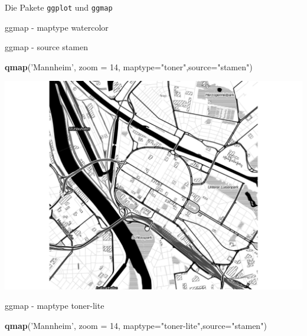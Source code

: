 \documentclass[ignorenonframetext,]{beamer}
\newenvironment{Shaded}{}{}
\newcommand{\KeywordTok}[1]{\textcolor[rgb]{0.00,0.44,0.13}{\textbf{{#1}}}}
\newcommand{\DataTypeTok}[1]{\textcolor[rgb]{0.56,0.13,0.00}{{#1}}}
\newcommand{\DecValTok}[1]{\textcolor[rgb]{0.25,0.63,0.44}{{#1}}}
\newcommand{\StringTok}[1]{\textcolor[rgb]{0.25,0.44,0.63}{{#1}}}
\newcommand{\NormalTok}[1]{{#1}}
\begin{document}
\begin{frame}[fragile]{Die Pakete \texttt{ggplot} und \texttt{ggmap}}
\begin{block}{ggmap - maptype watercolor}
\end{block}

\begin{block}{ggmap - source stamen}

\begin{Shaded}
\begin{Highlighting}[]
\KeywordTok{qmap}\NormalTok{(}\StringTok{'Mannheim'}\NormalTok{, }\DataTypeTok{zoom =} \DecValTok{14}\NormalTok{,}
 \DataTypeTok{maptype=}\StringTok{"toner"}\NormalTok{,}\DataTypeTok{source=}\StringTok{"stamen"}\NormalTok{)}
\end{Highlighting}
\end{Shaded}

\includegraphics{R_intern_files/figure-beamer/unnamed-chunk-267-1.pdf}

\end{block}

\begin{block}{ggmap - maptype toner-lite}

\begin{Shaded}
\begin{Highlighting}[]
\KeywordTok{qmap}\NormalTok{(}\StringTok{'Mannheim'}\NormalTok{, }\DataTypeTok{zoom =} \DecValTok{14}\NormalTok{,}
 \DataTypeTok{maptype=}\StringTok{"toner-lite"}\NormalTok{,}\DataTypeTok{source=}\StringTok{"stamen"}\NormalTok{)}
\end{Highlighting}
\end{Shaded}


\end{block}
\end{frame}
\end{document}
